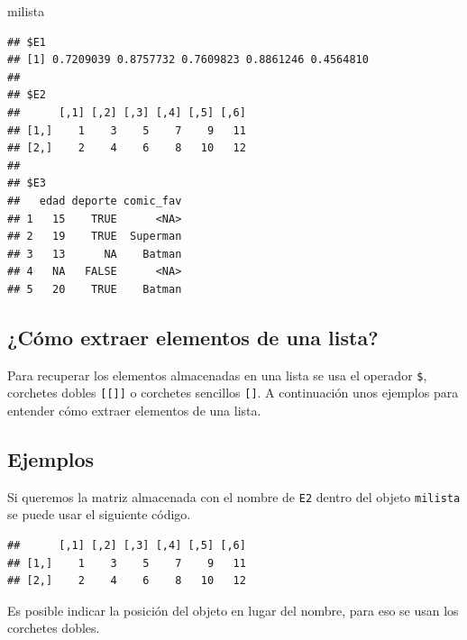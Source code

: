 \documentclass[
]{book}
\makeatletter
\newenvironment{Shaded}{\begin{snugshade}}{\end{snugshade}}
\newcommand{\NormalTok}[1]{#1}
\newcommand{\SpecialCharTok}[1]{\textcolor[rgb]{0.00,0.00,0.00}{#1}}
\newenvironment{kframe}{%
\medskip{}
\setlength{\fboxsep}{.8em}
 \def\at@end@of@kframe{}%
 \ifinner\ifhmode%
  \def\at@end@of@kframe{\end{minipage}}%
  \begin{minipage}{\columnwidth}%
 \fi\fi%
 \def\FrameCommand##1{\hskip\@totalleftmargin \hskip-\fboxsep
 \colorbox{shadecolor}{##1}\hskip-\fboxsep
     \hskip-\linewidth \hskip-\@totalleftmargin \hskip\columnwidth}%
 \MakeFramed {\advance\hsize-\width
   \@totalleftmargin\z@ \linewidth\hsize
   \@setminipage}}%
 {\par\unskip\endMakeFramed%
 \at@end@of@kframe}
\renewenvironment{Shaded}{\begin{kframe}}{\end{kframe}}
\makeatother
\begin{document}
\begin{Shaded}
\begin{Highlighting}[]
\NormalTok{milista}
\end{Highlighting}
\end{Shaded}

\begin{verbatim}
## $E1
## [1] 0.7209039 0.8757732 0.7609823 0.8861246 0.4564810
## 
## $E2
##      [,1] [,2] [,3] [,4] [,5] [,6]
## [1,]    1    3    5    7    9   11
## [2,]    2    4    6    8   10   12
## 
## $E3
##   edad deporte comic_fav
## 1   15    TRUE      <NA>
## 2   19    TRUE  Superman
## 3   13      NA    Batman
## 4   NA   FALSE      <NA>
## 5   20    TRUE    Batman
\end{verbatim}

\hypertarget{cuxf3mo-extraer-elementos-de-una-lista}{%
\subsection{¿Cómo extraer elementos de una lista?}\label{cuxf3mo-extraer-elementos-de-una-lista}}

Para recuperar los elementos almacenadas en una lista se usa el operador \texttt{\$}, corchetes dobles \texttt{{[}{[}{]}{]}} o corchetes sencillos \texttt{{[}{]}}. A continuación unos ejemplos para entender cómo extraer elementos de una lista.

\hypertarget{ejemplos-1}{%
\subsection*{Ejemplos}\label{ejemplos-1}}

Si queremos la matriz almacenada con el nombre de \texttt{E2} dentro del objeto \texttt{milista} se puede usar el siguiente código.

\begin{Shaded}
\end{Shaded}

\begin{verbatim}
##      [,1] [,2] [,3] [,4] [,5] [,6]
## [1,]    1    3    5    7    9   11
## [2,]    2    4    6    8   10   12
\end{verbatim}

Es posible indicar la posición del objeto en lugar del nombre, para eso se usan los corchetes dobles.
\end{document}
